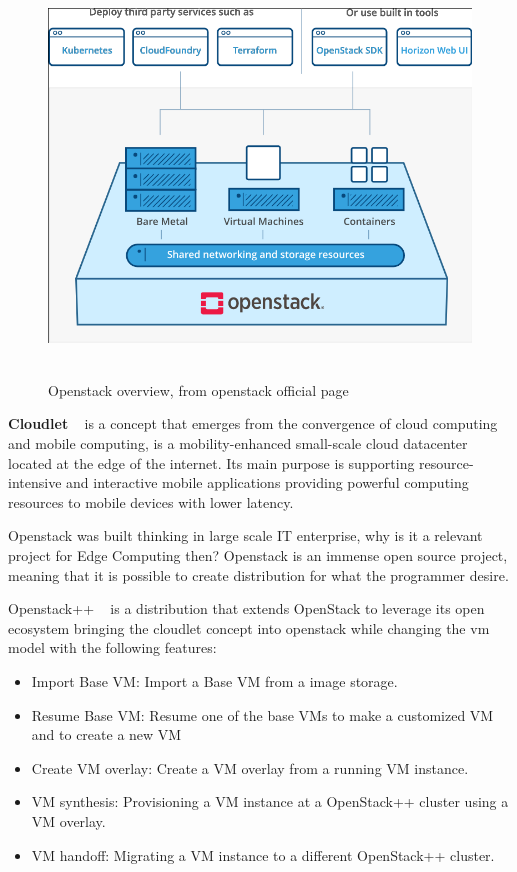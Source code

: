 \begin{figure}[h]%
    \includegraphics[width=6.0in]{figures/openstack.png}
~\caption{Openstack overview, from openstack official page}
\label{figure2.2}
\end{figure}

\newpage

\textbf{Cloudlet} ~\cite{cloudlet_def} is a concept that emerges from the convergence of cloud computing and mobile computing, is a mobility-enhanced small-scale cloud datacenter located at the edge of the internet. Its main purpose is supporting resource-intensive and interactive mobile applications providing powerful computing resources to mobile devices with lower latency.

Openstack was built thinking in large scale IT enterprise, why is it a relevant project for Edge Computing then? Openstack is an immense open source project, meaning that it is possible to create distribution for what the programmer desire.

Openstack++ ~\cite{Cloudlet:2015} is a distribution that extends OpenStack to leverage its open ecosystem bringing the cloudlet concept into openstack while changing the vm model with the following features:

\begin{itemize}
    \item Import Base VM: Import a Base VM from a image storage.
    \item Resume Base VM: Resume one of the base VMs to make a customized VM and to create a new VM
    \item Create VM overlay: Create a VM overlay from a running VM instance.
    \item VM synthesis: Provisioning a VM instance at a OpenStack++ cluster using a VM overlay.
    \item VM handoff: Migrating a VM instance to a different OpenStack++ cluster.
\end{itemize}

